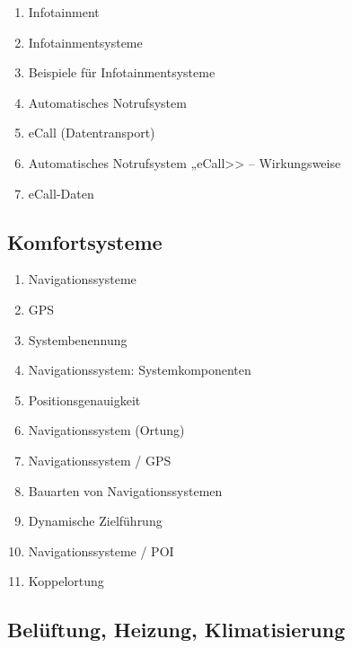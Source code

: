 \begin{enumerate}
\item
  Infotainment\\
\item
  Infotainmentsysteme\\
\item
  Beispiele für Infotainmentsysteme\\
\item
  Automatisches Notrufsystem\\
\item
  eCall (Datentransport)\\
\item
  Automatisches Notrufsystem „eCall>> -- Wirkungsweise\\
\item
  eCall-Daten
\end{enumerate}

\subsection{Komfortsysteme}\label{komfortsysteme}

\begin{enumerate}
\item
  Navigationssysteme\\
\item
  GPS\\
\item
  Systembenennung\\
\item
  Navigationssystem: Systemkomponenten\\
\item
  Positionsgenauigkeit\\
\item
  Navigationssystem (Ortung)\\
\item
  Navigationssystem / GPS\\
\item
  Bauarten von Navigationssystemen\\
\item
  Dynamische Zielführung\\
\item
  Navigationssysteme / POI\\
\item
  Koppelortung
\end{enumerate}

\subsection{Belüftung, Heizung,
Klimatisierung}\label{belueftung-heizung-klimatisierung}

